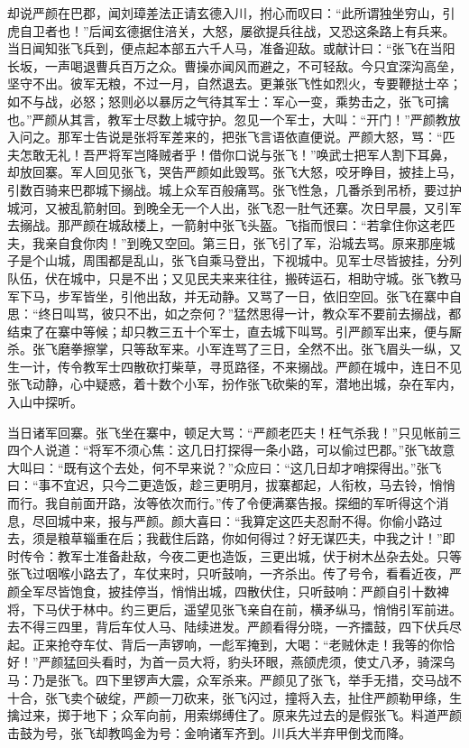 却说严颜在巴郡，闻刘璋差法正请玄德入川，拊心而叹曰：“此所谓独坐穷山，引虎自卫者也！”后闻玄德据住涪关，大怒，屡欲提兵往战，又恐这条路上有兵来。当日闻知张飞兵到，便点起本部五六千人马，准备迎敌。或献计曰：“张飞在当阳长坂，一声喝退曹兵百万之众。曹操亦闻风而避之，不可轻敌。今只宜深沟高垒，坚守不出。彼军无粮，不过一月，自然退去。更兼张飞性如烈火，专要鞭挞士卒；如不与战，必怒；怒则必以暴厉之气待其军士：军心一变，乘势击之，张飞可擒也。”严颜从其言，教军士尽数上城守护。忽见一个军士，大叫：“开门！”严颜教放入问之。那军士告说是张将军差来的，把张飞言语依直便说。严颜大怒，骂：“匹夫怎敢无礼！吾严将军岂降贼者乎！借你口说与张飞！”唤武士把军人割下耳鼻，却放回寨。军人回见张飞，哭告严颜如此毁骂。张飞大怒，咬牙睁目，披挂上马，引数百骑来巴郡城下搦战。城上众军百般痛骂。张飞性急，几番杀到吊桥，要过护城河，又被乱箭射回。到晚全无一个人出，张飞忍一肚气还寨。次日早晨，又引军去搦战。那严颜在城敌楼上，一箭射中张飞头盔。飞指而恨曰：“若拿住你这老匹夫，我亲自食你肉！”到晚又空回。第三日，张飞引了军，沿城去骂。原来那座城子是个山城，周围都是乱山，张飞自乘马登出，下视城中。见军士尽皆披挂，分列队伍，伏在城中，只是不出；又见民夫来来往往，搬砖运石，相助守城。张飞教马军下马，步军皆坐，引他出敌，并无动静。又骂了一日，依旧空回。张飞在寨中自思：“终日叫骂，彼只不出，如之奈何？”猛然思得一计，教众军不要前去搦战，都结束了在寨中等候；却只教三五十个军士，直去城下叫骂。引严颜军出来，便与厮杀。张飞磨拳擦掌，只等敌军来。小军连骂了三日，全然不出。张飞眉头一纵，又生一计，传令教军士四散砍打柴草，寻觅路径，不来搦战。严颜在城中，连日不见张飞动静，心中疑惑，着十数个小军，扮作张飞砍柴的军，潜地出城，杂在军内，入山中探听。

当日诸军回寨。张飞坐在寨中，顿足大骂：“严颜老匹夫！枉气杀我！”只见帐前三四个人说道：“将军不须心焦：这几日打探得一条小路，可以偷过巴郡。”张飞故意大叫曰：“既有这个去处，何不早来说？”众应曰：“这几日却才哨探得出。”张飞曰：“事不宜迟，只今二更造饭，趁三更明月，拔寨都起，人衔枚，马去铃，悄悄而行。我自前面开路，汝等依次而行。”传了令便满寨告报。探细的军听得这个消息，尽回城中来，报与严颜。颜大喜曰：“我算定这匹夫忍耐不得。你偷小路过去，须是粮草辎重在后；我截住后路，你如何得过？好无谋匹夫，中我之计！”即时传令：教军士准备赴敌，今夜二更也造饭，三更出城，伏于树木丛杂去处。只等张飞过咽喉小路去了，车仗来时，只听鼓响，一齐杀出。传了号令，看看近夜，严颜全军尽皆饱食，披挂停当，悄悄出城，四散伏住，只听鼓响：严颜自引十数裨将，下马伏于林中。约三更后，遥望见张飞亲自在前，横矛纵马，悄悄引军前进。去不得三四里，背后车仗人马、陆续进发。严颜看得分晓，一齐擂鼓，四下伏兵尽起。正来抢夺车仗、背后一声锣响，一彪军掩到，大喝：“老贼休走！我等的你恰好！”严颜猛回头看时，为首一员大将，豹头环眼，燕颌虎须，使丈八矛，骑深乌马：乃是张飞。四下里锣声大震，众军杀来。严颜见了张飞，举手无措，交马战不十合，张飞卖个破绽，严颜一刀砍来，张飞闪过，撞将入去，扯住严颜勒甲绦，生擒过来，掷于地下；众军向前，用索绑缚住了。原来先过去的是假张飞。料道严颜击鼓为号，张飞却教鸣金为号：金响诸军齐到。川兵大半弃甲倒戈而降。

